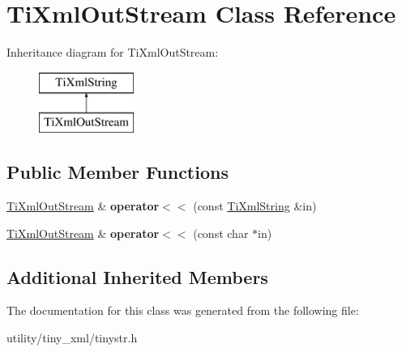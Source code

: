 \hypertarget{class_ti_xml_out_stream}{}\section{Ti\+Xml\+Out\+Stream Class Reference}
\label{class_ti_xml_out_stream}
Inheritance diagram for Ti\+Xml\+Out\+Stream\+:\begin{figure}[H]
\begin{center}
\leavevmode
\includegraphics[height=2.000000cm]{class_ti_xml_out_stream}
\end{center}
\end{figure}
\subsection*{Public Member Functions}
\begin{DoxyCompactItemize}
\item 
\hypertarget{class_ti_xml_out_stream_a3640dcb1c0903be3bc6966cdc9a79db6}{}\label{class_ti_xml_out_stream_a3640dcb1c0903be3bc6966cdc9a79db6} 
\hyperlink{class_ti_xml_out_stream}{Ti\+Xml\+Out\+Stream} \& {\bfseries operator$<$$<$} (const \hyperlink{class_ti_xml_string}{Ti\+Xml\+String} \&in)
\item 
\hypertarget{class_ti_xml_out_stream_af2117e5a8cbfcb69544804ad2859bfb6}{}\label{class_ti_xml_out_stream_af2117e5a8cbfcb69544804ad2859bfb6} 
\hyperlink{class_ti_xml_out_stream}{Ti\+Xml\+Out\+Stream} \& {\bfseries operator$<$$<$} (const char $\ast$in)
\end{DoxyCompactItemize}
\subsection*{Additional Inherited Members}


The documentation for this class was generated from the following file\+:\begin{DoxyCompactItemize}
\item 
utility/tiny\+\_\+xml/tinystr.\+h\end{DoxyCompactItemize}

